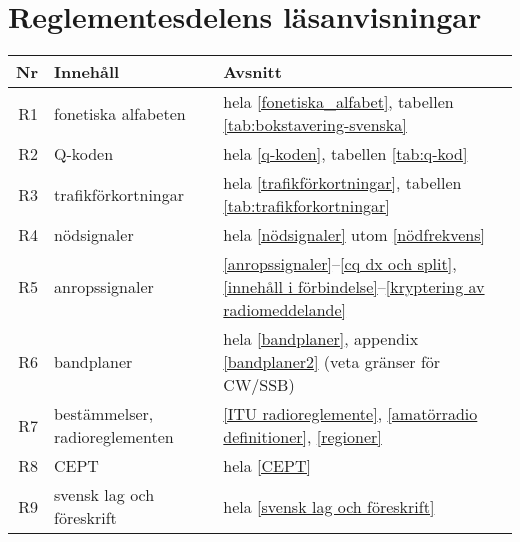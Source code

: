 \newpage

\section{Reglementesdelens läsanvisningar}

\begin{table}[H]
\small
\begin{tabular}{rll}
\textbf{Nr} & \textbf{Innehåll} & \textbf{Avsnitt}\\ \hline\hline
R1 & fonetiska alfabeten & 
hela \ref{fonetiska_alfabet}, tabellen \ref{tab:bokstavering-svenska}\\ \hline
R2 & Q-koden &
hela \ref{q-koden}, tabellen \ref{tab:q-kod}\\ \hline
R3 & trafikförkortningar & 
hela \ref{trafikförkortningar}, tabellen \ref{tab:trafikforkortningar}\\ \hline
R4 & nödsignaler & 
hela \ref{nödsignaler} utom \ref{nödfrekvens}\\ \hline
R5 & anropssignaler & 
\ref{anropssignaler}--\ref{cq dx och split}, \ref{innehåll i förbindelse}--\ref{kryptering av radiomeddelande} \\ \hline
R6 & bandplaner &
hela \ref{bandplaner}, appendix \ref{bandplaner2} (veta gränser för CW/SSB)\\ \hline
R7 & bestämmelser, radioreglementen & 
\ref{ITU radioreglemente}, \ref{amatörradio definitioner}, \ref{regioner}\\ \hline
R8 & CEPT &
hela \ref{CEPT} \\ \hline
R9 & svensk lag och föreskrift & 
hela \ref{svensk lag och föreskrift} \\ \hline
\end{tabular}
\normalsize
\end{table}

\twocolumn
